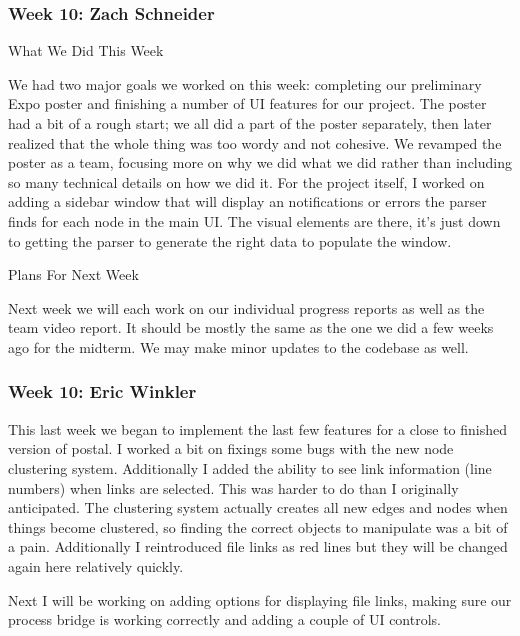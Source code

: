  \subsubsection{Week 10: Zach Schneider}

What We Did This Week

We had two major goals we worked on this week: completing our preliminary Expo poster and finishing a number of UI features for our project. The poster had a bit of a rough start; we all did a part of the poster separately, then later realized that the whole thing was too wordy and not cohesive. We revamped the poster as a team, focusing more on why we did what we did rather than including so many technical details on how we did it. For the project itself, I worked on adding a sidebar window that will display an notifications or errors the parser finds for each node in the main UI. The visual elements are there, it's just down to getting the parser to generate the right data to populate the window.



Plans For Next Week

Next week we will each work on our individual progress reports as well as the team video report. It should be mostly the same as the one we did a few weeks ago for the midterm. We may make minor updates to the codebase as well. \\ 

 \subsubsection{Week 10: Eric Winkler}

This last week we began to implement the last few features for a close to finished version of postal. I worked a bit on fixings some bugs with the new node clustering system. Additionally I added the ability to see link information (line numbers) when links are selected. This was harder to do than I originally anticipated. The clustering system actually creates all new edges and nodes when things become clustered, so finding the correct objects to manipulate was a bit of a pain. Additionally I reintroduced file links as red lines but they will be changed again here relatively quickly.



Next I will be working on adding options for displaying file links, making sure our process bridge is working correctly and adding a couple of UI controls. \\ 

